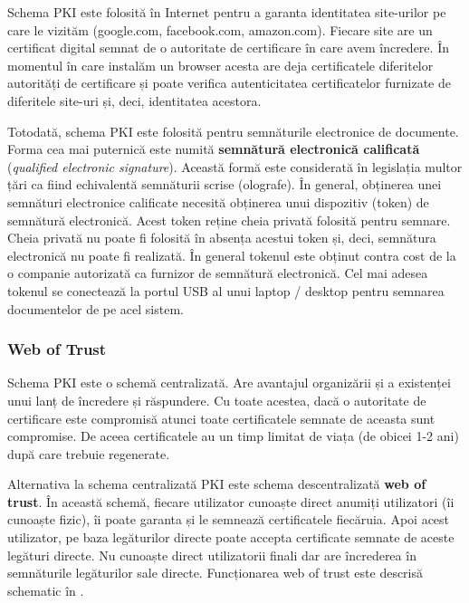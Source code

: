 Schema PKI este folosită în Internet pentru a garanta identitatea site-urilor pe care le vizităm (google.com, facebook.com, amazon.com). Fiecare site are un certificat digital semnat de o autoritate de certificare în care avem încredere. În momentul în care instalăm un browser acesta are deja certificatele diferitelor autorități de certificare și poate verifica autenticitatea certificatelor furnizate de diferitele site-uri și, deci, identitatea acestora.

Totodată, schema PKI este folosită pentru semnăturile electronice de documente.
Forma cea mai puternică este numită \textbf{semnătură electronică calificată} (\textit{qualified electronic signature}).
Această formă este considerată în legislația multor țări ca fiind echivalentă semnăturii scrise (olografe).
În general, obținerea unei semnături electronice calificate necesită obținerea unui dispozitiv (token) de semnătură electronică.
Acest token reține cheia privată folosită pentru semnare. Cheia privată nu poate fi folosită în absența acestui token și, deci, semnătura electronică nu poate fi realizată.
În general tokenul este obținut contra cost de la o companie autorizată ca furnizor de semnătură electronică.
Cel mai adesea tokenul se conectează la portul USB al unui laptop / desktop pentru semnarea documentelor de pe acel sistem.

\subsubsection{Web of Trust}
\label{sec:sec:transfer:sign:wot}

Schema PKI este o schemă centralizată. Are avantajul organizării și a existenței unui lanț de încredere și răspundere. Cu toate acestea, dacă o autoritate de certificare este compromisă atunci toate certificatele semnate de aceasta sunt compromise. De aceea certificatele au un timp limitat de viața (de obicei 1-2 ani) după care trebuie regenerate.

Alternativa la schema centralizată PKI este schema descentralizată \textbf{web of trust}. În această schemă, fiecare utilizator cunoaște direct anumiți utilizatori (îi cunoaște fizic), îi poate garanta și le semnează certificatele fiecăruia. Apoi acest utilizator, pe baza legăturilor directe poate accepta certificate semnate de aceste legături directe. Nu cunoaște direct utilizatorii finali dar are încrederea în semnăturile legăturilor sale directe. Funcționarea web of trust este descrisă schematic în .

